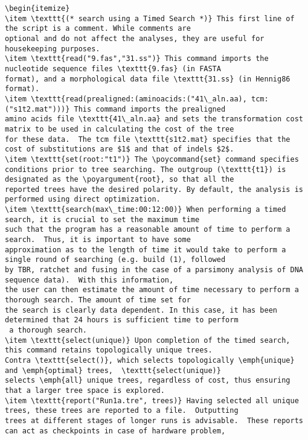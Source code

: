 \begin{verbatim}
\begin{itemize}
\item \texttt{(* search using a Timed Search *)} This first line of the script is a comment. While comments are 
optional and do not affect the analyses, they are useful for housekeeping purposes.
\item \texttt{read("9.fas","31.ss")} This command imports the nucleotide sequence files \texttt{9.fas} (in FASTA 
format), and a morphological data file \texttt{31.ss} (in Hennig86 format).
\item \texttt{read(prealigned:(aminoacids:("41\_aln.aa), tcm:("s1t2.mat")))} This command imports the prealigned
amino acids file \texttt{41\_aln.aa} and sets the transformation cost matrix to be used in calculating the cost of the tree
for these data.  The tcm file \texttt{s1t2.mat} specifies that the cost of substitutions are $1$ and that of indels $2$.
\item \texttt{set(root:"t1")} The \poycommand{set} command specifies 
conditions prior to tree searching. The outgroup (\texttt{t1}) is designated as the \poyargument{root}, so that all the 
reported trees have the desired polarity. By default, the analysis is performed using direct optimization.
\item \texttt{search(max\_time:00:12:00)} When performing a timed search, it is crucial to set the maximum time 
such that the program has a reasonable amount of time to perform a search.  Thus, it is important to have some 
approximation as to the length of time it would take to perform a single round of searching (e.g. build (1), followed 
by TBR, ratchet and fusing in the case of a parsimony analysis of DNA sequence data).  With this information, 
the user can then estimate the amount of time necessary to perform a thorough search. The amount of time set for 
the search is clearly data dependent. In this case, it has been determined that 24 hours is sufficient time to perform 
 a thorough search.
\item \texttt{select(unique)} Upon completion of the timed search, this command retains topologically unique trees.
Contra \texttt{select()}, which selects topologically \emph{unique} and \emph{optimal} trees,  \texttt{select(unique)} 
selects \emph{all} unique trees, regardless of cost, thus ensuring that a larger tree space is explored.
\item \texttt{report("Run1a.tre", trees)} Having selected all unique trees, these trees are reported to a file.  Outputting
trees at different stages of longer runs is advisable.  These reports can act as checkpoints in case of hardware problem, 

\end{verbatim}
